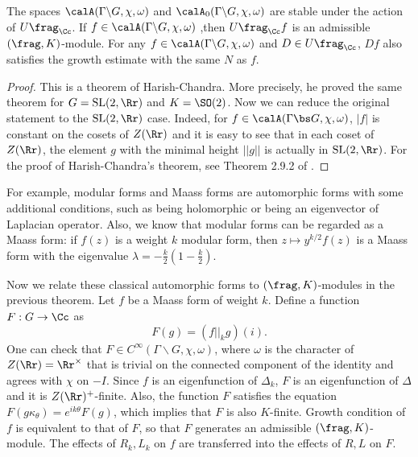 \begin{theorem}
\label{autoadm}
The spaces $\calA(\Gamma\backslash G, \chi, \omega)$ and $\calA_{0}(\Gamma \backslash G, \chi, \omega)$ are stable under the action of $U\frag_{\Cc}$. If $f\in \calA(\Gamma\backslash G, \chi, \omega)$ ,then $U\frag_{\Cc}f$ is an admissible $(\frag, K)$-module. 
For any $f\in  \calA(\Gamma\backslash G, \chi, \omega)$ and $D\in U\frag_{\Cc}$, $Df$ also satisfies the growth estimate with the same $N$ as $f$. 
\end{theorem}

\begin{proof}
This is a theorem of Harish-Chandra. More precisely, he proved the same theorem for $G = \SL(2, \Rr)$ and $K = \SO(2)$. Now we can reduce the original statement to the $\SL(2, \Rr)$ case. 
Indeed, for $f\in \calA(\Gamma \bs G, \chi, \omega)$, $|f|$ is constant on the cosets of $Z(\Rr)$ and it is easy to see that in each coset of $Z(\Rr)$, the element $g$ with the minimal height $||g||$ is actually in $\SL(2, \Rr)$. 
For the proof of Harish-Chandra's theorem, see Theorem 2.9.2 of \cite{bu}.
\end{proof}

For example, modular forms and Maass forms are automorphic forms with some additional conditions, such as being holomorphic  or being an eigenvector of Laplacian operator. 
Also, we know that modular forms can be regarded as a Maass form: if $f(z)$ is a weight $k$ modular form, then $z\mapsto y^{k/2}f(z)$ is a Maass form with the eigenvalue $\lambda = -\frac{k}{2}\left(1-\frac{k}{2}\right)$. 

Now we relate these classical automorphic forms to $(\frag, K)$-modules in the previous theorem. Let $f$ be a Maass form of weight $k$. Define a function $F:G\to \Cc$ as
$$
F(g) = (f||_{k}g)(i). 
$$
One can check that $F\in C^{\infty}(\Gamma\backslash G, \chi, \omega)$, where $\omega$ is the character of $Z(\Rr) = \Rr^{\times}$ that is trivial on the connected component of the identity and agrees with $\chi$ on $-I$. Since $f$ is an eigenfunction of $\Delta_{k}$, $F$ is an eigenfunction of $\Delta$ and it is $Z(\Rr)^{+}$-finite. 
Also, the function $F$ satisfies the equation $F(g\kappa_{\theta}) = e^{ik\theta} F(g)$, which implies that $F$ is also $K$-finite. Growth condition of $f$ is equivalent to that of $F$, so that $F$ generates an admissible $(\frag, K)$-module. The effects of $R_{k}, L_{k}$ on $f$ are transferred into the effects of $R, L$ on $F$. 



